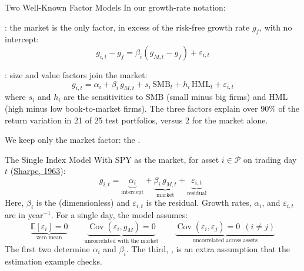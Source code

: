 \documentclass[aspectratio=169,11pt]{beamer}
\newcommand{\E}{\mathbb{E}}
\newcommand{\Cov}{\operatorname{Cov}}
\begin{document}
\begin{frame}{Two Well-Known Factor Models}
  In our growth-rate notation:

  \vspace{0.4em}
  : the market is the only factor, in
  excess of the risk-free growth rate $g_f$, with no intercept:
  \[
    g_{i,t}-g_f=\beta_i\left(g_{M,t}-g_f\right)+\varepsilon_{i,t}
  \]

  : size and value factors join the market:
  \[
    g_{i,t}=\alpha_i+\beta_i\,g_{M,t}+s_i\,\mathrm{SMB}_t+h_i\,\mathrm{HML}_t+\varepsilon_{i,t}
  \]
  where $s_i$ and $h_i$ are the sensitivities to SMB (small minus big firms) and
  HML (high minus low book-to-market firms). The three factors explain over 90\%
  of the return variation in 21 of 25 test portfolios, versus 2 for the market alone.

  \vspace{0.4em}
  We keep only the market factor: the .
\end{frame}

\begin{frame}{The Single Index Model}
  With SPY as the market, for asset $i\in\mathcal P$ on trading day $t$
  (\href{https://doi.org/10.1287/mnsc.9.2.277}{Sharpe, 1963}):
  \[
    \boxed{g_{i,t}=\underbrace{\alpha_i}_{\text{intercept}}
      +\underbrace{\beta_i\,g_{M,t}}_{\text{market}}
      +\underbrace{\varepsilon_{i,t}}_{\text{residual}}}
  \]
  Here, $\beta_i$ is the  (dimensionless) and
  $\varepsilon_{i,t}$ is the  residual. Growth rates,
  $\alpha_i$, and $\varepsilon_{i,t}$ are in year$^{-1}$. For a single day, the
  model assumes:
  \[
    \underbrace{\E[\varepsilon_i]=0}_{\text{zero mean}}\qquad
    \underbrace{\Cov(\varepsilon_i,g_M)=0}_{\text{uncorrelated with the market}}\qquad
    \underbrace{\Cov(\varepsilon_i,\varepsilon_j)=0\ \ (i\neq j)}_{\text{uncorrelated across assets}}
  \]
  The first two determine $\alpha_i$ and $\beta_i$. The third,
  , is an extra assumption that
  the estimation example checks.
\end{frame}
\end{document}
